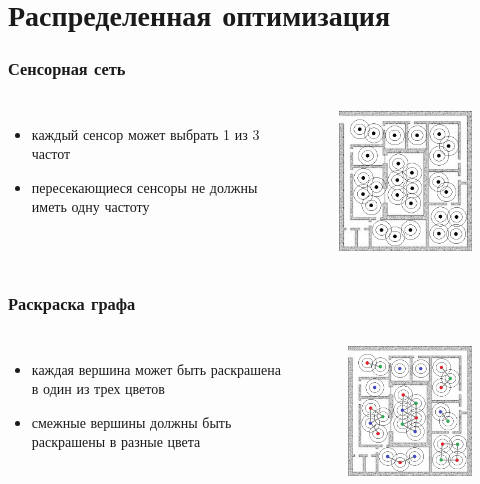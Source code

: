 \documentclass{beamer}
\begin{document}
\section{Распределенная оптимизация}

\begin{frame}
  \frametitle{Сенсорная сеть}
  \begin{columns}[c]
    \begin{itemize}
      \item каждый сенсор может выбрать 1 из 3 частот
      \item пересекающиеся сенсоры не должны иметь одну частоту
    \end{itemize}

    \begin{figure}
       \includegraphics[width=5cm]{images/sensors.jpg}
    \end{figure}
  \end{columns}
\end{frame}

\begin{frame}
  \frametitle{Раскраска графа}
  \begin{columns}[c]
    \begin{itemize}
      \item каждая вершина может быть раскрашена в один из трех цветов
      \item смежные вершины должны быть раскрашены в разные цвета
    \end{itemize}

    \begin{figure}
       \includegraphics[width=5cm]{images/graph-coloring.jpg}
    \end{figure}
  \end{columns}
\end{frame}
\end{document}
